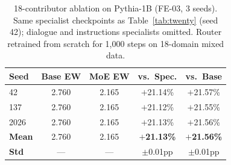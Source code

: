 \documentclass{article}
\begin{document}
\begin{table}[h]
\centering
\caption{18-contributor ablation on Pythia-1B (FE-03, 3 seeds). Same specialist checkpoints as
Table~\ref{tab:twenty} (seed 42); dialogue and instructions specialists omitted.
Router retrained from scratch for 1{,}000 steps on 18-domain mixed data.}
\label{tab:eighteen}
\small
\begin{tabular}{lcccc}
\toprule
\textbf{Seed} & \textbf{Base EW} & \textbf{MoE EW} & \textbf{vs.\ Spec.} & \textbf{vs.\ Base} \\
\midrule
42   & 2.760 & 2.165 & $+$21.14\% & $+$21.57\% \\
137  & 2.760 & 2.165 & $+$21.12\% & $+$21.55\% \\
2026 & 2.760 & 2.165 & $+$21.13\% & $+$21.56\% \\
\midrule
\textbf{Mean} & 2.760 & 2.165 & \textbf{$+$21.13\%} & \textbf{$+$21.56\%} \\
\textbf{Std}  & ---   & ---   & $\pm$0.01pp        & $\pm$0.01pp        \\
\bottomrule
\end{tabular}
\end{table}
\end{document}
